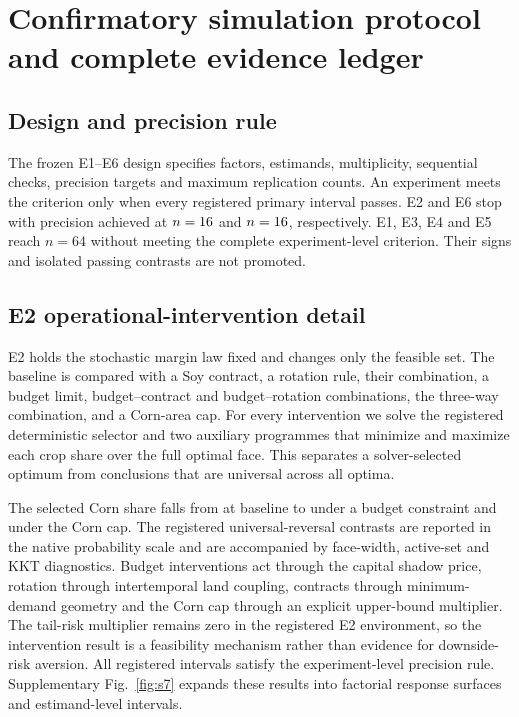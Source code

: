 \section{Confirmatory simulation protocol and complete evidence ledger}

\subsection{Design and precision rule}
The frozen E1--E6 design specifies factors, estimands, multiplicity, sequential checks, precision targets and maximum replication counts. An experiment meets the criterion only when every registered primary interval passes. E2 and E6 stop with precision achieved at $n=16{}$ and $n=16{}$, respectively. E1, E3, E4 and E5 reach $n=64$ without meeting the complete experiment-level criterion. Their signs and isolated passing contrasts are not promoted.

\subsection{E2 operational-intervention detail}
E2 holds the stochastic margin law fixed and changes only the feasible set. The baseline is compared with a Soy contract, a rotation rule, their combination, a budget limit, budget--contract and budget--rotation combinations, the three-way combination, and a Corn-area cap. For every intervention we solve the registered deterministic selector and two auxiliary programmes that minimize and maximize each crop share over the full optimal face. This separates a solver-selected optimum from conclusions that are universal across all optima.

The selected Corn share falls from \EtwoBaseCorn{} at baseline to \EtwoBudgetCorn{} under a budget constraint and \EtwoForcedCorn{} under the Corn cap. The registered universal-reversal contrasts are reported in the native probability scale and are accompanied by face-width, active-set and KKT diagnostics. Budget interventions act through the capital shadow price, rotation through intertemporal land coupling, contracts through minimum-demand geometry and the Corn cap through an explicit upper-bound multiplier. The tail-risk multiplier remains zero in the registered E2 environment, so the intervention result is a feasibility mechanism rather than evidence for downside-risk aversion. All \EtwoIntervals{} registered intervals satisfy the experiment-level precision rule. Supplementary Fig.~\ref{fig:s7} expands these results into factorial response surfaces and estimand-level intervals.

